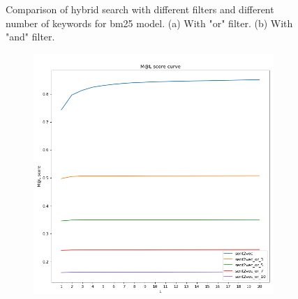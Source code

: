 \documentclass[10pt,a4paper,fleqn]{report}
\begin{document}
\begin{figure}[htbp]
\begin{subfigure}[b]{0.48\textwidth}
						\caption{}
						\label{fig: hybrid_bm25_and}
					\end{subfigure}
					\hfill
					\caption[]{Comparison of hybrid search with different filters and different number of keywords for bm25 model. (a) With "or" filter. (b) With "and" filter.}
					\label{fig: hybrid_bm25_and_or}
				\end{figure}
				
				\begin{figure}[htbp]
					\centering
					\begin{subfigure}[b]{0.48\textwidth}
						\centering
						\includegraphics[width=\textwidth]{figure/sent2vec_or.png}
						\caption{}
						\label{fig: hybrid_sent2vec_or}
					\end{subfigure}
					\hfill
					\begin{subfigure}[b]{0.48\textwidth}
						\centering

\end{subfigure}
\end{figure}
\end{document}
